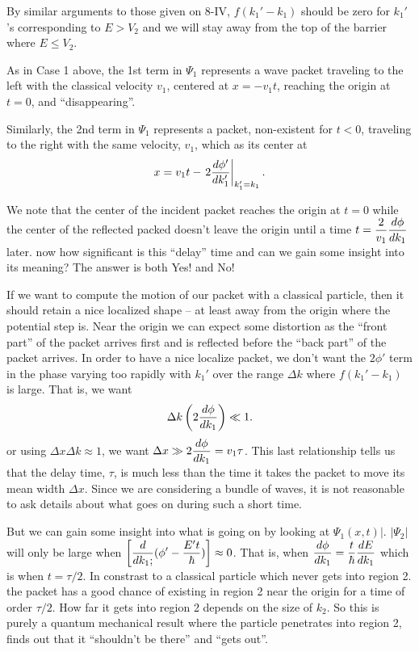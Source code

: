  By similar arguments to those given on 8-IV, $f(k_1'-k_1)$ should be zero for $k_1'$'s corresponding to $E> V_2$ and we will stay away from the top of the barrier where $E\le V_2$.
 
 As in Case 1 above, the 1st term in $\Psi_1$ represents a wave packet traveling to the left with the classical velocity $v_1$, centered at $x = - v_1t$, reaching the origin at $t=0$, and ``disappearing''.
 
 Similarly, the 2nd term in $\Psi_1$ represents a packet, non-existent for $t<0$, traveling to the right with the same velocity, $v_1$, which as its center at 
 $$ x = v_1t - \left.2{d\phi'\over dk_1'}\right|_{k_1' = k_1}.$$
 
We note that the center of the incident packet reaches the origin at $t=0$ while the center of the reflected packed doesn't leave the origin until a time $\displaystyle t = {2\over v_1}{d\phi\over dk_1}$ later. now how significant is this
``delay'' time and can we gain some insight into its meaning? The answer is both Yes! and No!

If we want to compute the motion of our packet with a classical particle, then it should retain a nice localized shape -- at least away from the origin where the potential step is. Near the origin we can expect
some distortion as the ``front part'' of the packet arrives first and is reflected before the ``back part'' of the packet arrives. In order to have a nice localize packet, we don't want the $2\phi'$ term in the phase varying too 
rapidly with $k_1'$ over the range $\Delta k$ where $f(k_1' - k_1)$ is large. That is, we want 
$$\Delta k \left(2 {d\phi\over dk_1}\right) \ll 1.$$ or using $\Delta x \Delta k \approx 1$, we want $\displaystyle \Delta x \gg 2{d\phi\over dk_1} = v_1 \tau$.  This last relationship tells us that the delay time, $\tau$, is much
less than the time it takes the packet to move its mean width $\Delta x$. Since we are considering a bundle of waves, it is not reasonable to ask details about what goes on during such a short time. 

But we can gain some insight into what is going on by looking at $\Psi_1(x,t)|$. $|\Psi_2|$ will only be large when $\displaystyle \left[{d\over dk_1;}(\phi' - {E't\over \hbar})\right] \approx 0$. That is, when 
$\displaystyle {d\phi\over dk_1} = {t\over\hbar}{dE\over dk_1}$ which is when $t=\tau/2$. In constrast to a classical particle which never gets into region 2. the packet has a good chance of existing in region 2 near the
origin for a time of order $\tau/2$. How far it gets into region 2 depends on the size of $k_2$. So this is purely a quantum mechanical result where the particle penetrates into region 2, finds out that it ``shouldn't be there''
and ``gets out''.

